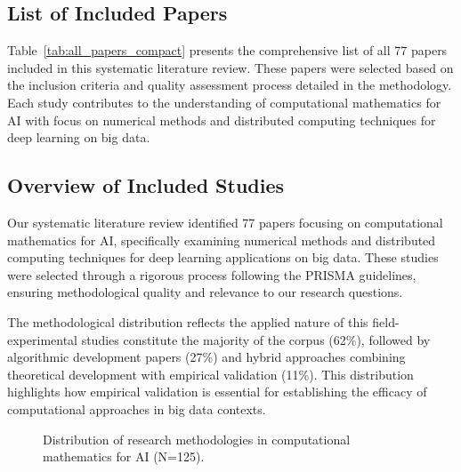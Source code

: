 \subsection{List of Included Papers}
Table~\ref{tab:all_papers_compact} presents the comprehensive list of all 77 papers included in this systematic literature review. These papers were selected based on the inclusion criteria and quality assessment process detailed in the methodology. Each study contributes to the understanding of computational mathematics for AI with focus on numerical methods and distributed computing techniques for deep learning on big data.



\subsection{Overview of Included Studies}
Our systematic literature review identified 77 papers focusing on computational mathematics for AI, specifically examining numerical methods and distributed computing techniques for deep learning applications on big data. These studies were selected through a rigorous process following the PRISMA guidelines, ensuring methodological quality and relevance to our research questions.

The methodological distribution reflects the applied nature of this field-experimental studies constitute the majority of the corpus (62\%), followed by algorithmic development papers (27\%) and hybrid approaches combining theoretical development with empirical validation (11\%). This distribution highlights how empirical validation is essential for establishing the efficacy of computational approaches in big data contexts.

\begin{figure}[ht]
\centering
{}
\caption{Distribution of research methodologies in computational mathematics for AI (N=125).}
\label{fig:methodology_distribution}
\end{figure}

